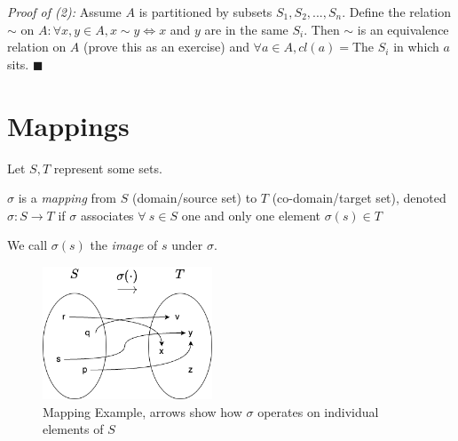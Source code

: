 \begin{theorem}
\noindent\textit{Proof of (2):} Assume $A$ is partitioned by subsets $S_1,S_2,...,S_n$. Define the relation $\sim$ on $A: \forall x,y \in A, x\sim y \iff x$ and $y$ are in the same $S_i$. Then $\sim$ is an equivalence relation on $A$ (prove this as an exercise) and $\forall a \in A, cl(a)=$The $S_i$ in which $a$ sits.
$\blacksquare$
\end{theorem}



\section{Mappings} Let $S,T$ represent some sets.\\
\begin{definition}
$\sigma$ is a \textit{mapping} from $S$ (domain/source set) to $T$ (co-domain/target set), denoted $\sigma: S \rightarrow T$ if $\sigma$ associates $\forall \ s \in S$ one and only one element $\sigma(s)\in T$
\end{definition}
\noindent We call $\sigma(s)$ the \textit{image} of $s$ under $\sigma$.\steezybreak\\ 

\begin{figure}[ht!]
    \centering
    \includegraphics[width=0.45\textwidth]{Figures/Mappings_example.png}
    \caption{Mapping Example, arrows show how $\sigma$ operates on individual elements of $S$}
    \label{fig:simple_mapping_example}
\end{figure}

